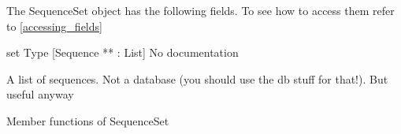 \label{object_SequenceSet}

The SequenceSet object has the following fields. To see how to access them refer to \ref{accessing_fields}
\begin{description}
\item{set} Type [Sequence ** : List] No documentation

\end{description}
A list of sequences. Not a database (you should
use the db stuff for that!). But useful anyway




Member functions of SequenceSet

